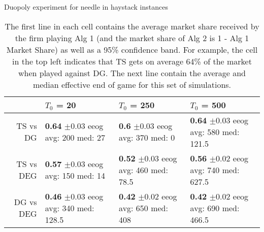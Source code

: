 \documentclass[../competing_bandits.tex]{subfiles}
\begin{document}
\begin{table}[ht]
\centering
\caption{Duopoly experiment for needle in haystack instances}
\begin{tabular}{rlll}
  \hline
 & $T_0$ = 20 & $T_0$ = 250 & $T_0$ = 500 \\
  \hline
TS vs DG & \makecell{\textbf{0.64} $\pm$0.03\\ eeog \\ avg: 200\\ med: 27} & \makecell{\textbf{0.6} $\pm$0.03\\ eeog \\ avg: 370\\ med: 0} & \makecell{\textbf{0.64} $\pm$0.03\\ eeog \\ avg: 580\\ med: 121.5} \\
  TS vs DEG & \makecell{\textbf{0.57} $\pm$0.03\\ eeog \\ avg: 150\\ med: 14} & \makecell{\textbf{0.52} $\pm$0.03\\ eeog \\ avg: 460\\ med: 78.5} & \makecell{\textbf{0.56} $\pm$0.02\\ eeog \\ avg: 740\\ med: 627.5} \\
  DG vs DEG & \makecell{\textbf{0.46} $\pm$0.03\\ eeog \\ avg: 340\\ med: 128.5} & \makecell{\textbf{0.42} $\pm$0.02\\ eeog \\ avg: 650\\ med: 408} & \makecell{\textbf{0.42} $\pm$0.02\\ eeog \\ avg: 690\\ med: 466.5} \\
   \hline
\end{tabular}
\label{sim_nih}
\caption*{{The first line in each cell contains the average market share received by the firm playing Alg 1 (and the market share of Alg 2 is 1 - Alg 1 Market Share) as well as a 95\% confidence band. For example, the cell in the top left indicates that TS gets on average 64\% of the market when played against DG. The next line contain the average and median effective end of game for this set of simulations.}}
\end{table}
\end{document}
